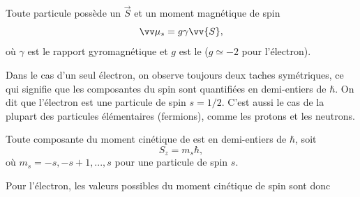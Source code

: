 \documentclass[12pt,fancy]{cours}
\begin{document}
\begin{enumerate}
  \begin{prop}[Spin]\label{prop:quant}
    Toute particule possède un  $\Vec{S}$ et un moment magnétique de spin
    \begin{equation*}
      \M_s = g\gamma\vv{S},
    \end{equation*}
    où $\gamma$ est le rapport gyromagnétique et $g$ est le  ($g\simeq-2$ pour l'électron).
  \end{prop}
  Dans le cas d'un seul électron, on observe toujours deux taches symétriques, ce qui signifie que les composantes du spin sont quantifiées en demi-entiers de $\hbar$. On dit que l'électron est une particule de spin $s=1/2$. C'est aussi le cas de la plupart des particules élémentaires (fermions), comme les protons et les neutrons.
  \begin{prop}\label{prop:}
    Toute composante du moment cinétique de  est  en demi-entiers de $\hbar$, soit
    \begin{equation*}
  S_z = m_s \hbar,
\end{equation*}
où $m_s = -s, -s+1, ..., s$ pour une particule de spin $s$.
  \end{prop}
  Pour l'électron, les valeurs possibles du moment cinétique de spin  sont donc 

  
\end{enumerate}




\end{document}
